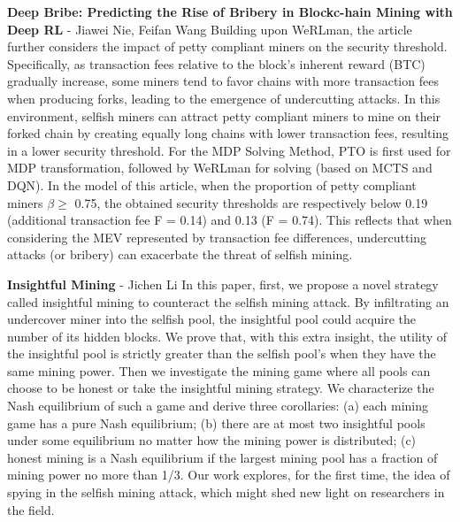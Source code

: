 \textbf{Deep Bribe: Predicting the Rise of Bribery in Blockc-hain Mining with Deep RL} - Jiawei Nie, Feifan Wang 
\cite{bar2023deep}Building upon WeRLman, the article further considers the impact of petty compliant miners on the security threshold. Specifically, as transaction fees relative to the block's inherent reward (BTC) gradually increase, some miners tend to favor chains with more transaction fees when producing forks, leading to the emergence of undercutting attacks. In this environment, selfish miners can attract petty compliant miners to mine on their forked chain by creating equally long chains with lower transaction fees, resulting in a lower security threshold. For the MDP Solving Method, PTO is first used for MDP transformation, followed by WeRLman for solving (based on MCTS and DQN). In the model of this article, when the proportion of petty compliant miners $\beta\geq$  0.75, the obtained security thresholds are respectively below 0.19 (additional transaction fee F = 0.14) and 0.13 (F = 0.74). This reflects that when considering the MEV represented by transaction fee differences, undercutting attacks (or bribery) can exacerbate the threat of selfish mining.

\textbf{Insightful Mining} - Jichen Li
In this paper, first, we propose a novel strategy called insightful mining to counteract the selfish mining attack. 
By infiltrating an undercover miner into the selfish pool, the insightful pool could acquire the number of its hidden blocks.
We prove that, with this extra insight, the utility of the insightful pool is strictly greater than the selfish pool’s when they have the same mining power. 
Then we investigate the mining game where all pools can choose to be honest or take the insightful mining strategy. 
We characterize the Nash equilibrium of such a game and derive three corollaries: 
(a) each mining game has a pure Nash equilibrium; 
(b) there are at most two insightful pools under some equilibrium no matter how the mining power is distributed; 
(c) honest mining is a Nash equilibrium if the largest mining pool has a fraction of mining power no more than 1/3.
Our work explores, for the first time, the idea of spying in the selfish mining attack, which might shed new light on researchers in the field.

